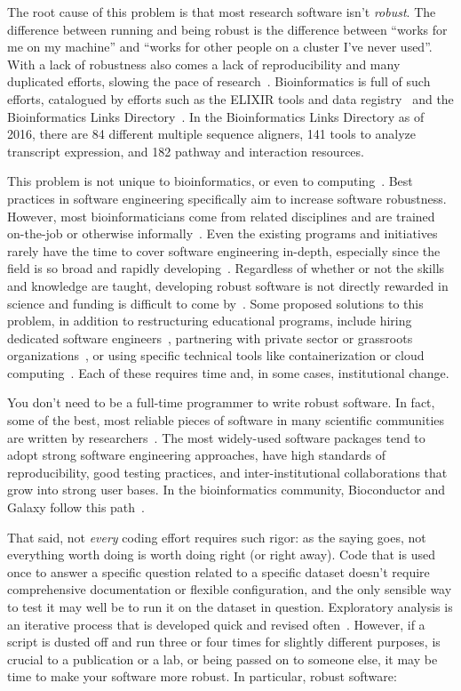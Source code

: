 \documentclass[10pt,letterpaper]{article}
\begin{document}
The root cause of this problem is that most research software
isn't \emph{robust}. The difference between running and being
robust is the difference between ``works for me on my machine'' and
``works for other people on a cluster I've never used''. With a lack of
robustness also comes a lack of reproducibility and many duplicated efforts,
slowing the pace of research~\cite{prabhu2011,lawlor2015}.
Bioinformatics is full of such efforts, catalogued by efforts such as
the ELIXIR tools and data registry~\cite{ison2016}
and the Bioinformatics Links Directory~\cite{brazas2012}. In the Bioinformatics
Links Directory as of 2016, there are 84 different multiple sequence aligners, 141 tools
to analyze transcript expression, and 182 pathway and interaction resources.

This problem is not unique to bioinformatics, or even to computing~\cite{baker2016}. 
Best practices in software engineering specifically aim to increase software
robustness. However, most bioinformaticians come from related disciplines and
are trained on-the-job or otherwise informally~\cite{prins2015,atwood2015}. Even
the existing programs and initiatives rarely have the time to cover software engineering
in-depth, especially since the field is so broad and rapidly
developing~\cite{atwood2015,lawlor2015}. Regardless of whether or not the skills
and knowledge are taught, developing robust software is not directly rewarded
in science and funding is difficult to come by~\cite{prins2015}. Some proposed
solutions to this problem, in addition to restructuring educational programs,
include hiring dedicated software engineers~\cite{lawlor2015,sanders2008},
partnering with private sector or grassroots organizations~\cite{prins2015,ison2016},
or using specific technical tools like containerization or cloud
computing~\cite{afgan2016,howe2012}. Each of these requires time and, in some
cases, institutional change.

You don't need to be a full-time programmer to write robust software. In fact,
some of the best, most reliable pieces of software in many scientific
communities are written by researchers~\cite{prabhu2011,sanders2008}. 
The most widely-used software packages tend to adopt strong software
engineering approaches, have high standards of reproducibility, good testing
practices, and inter-institutional collaborations that grow into strong user
bases. In the bioinformatics community, Bioconductor and Galaxy follow this
path~\cite{gentleman2004,afgan2016}.

That said, not \emph{every} coding effort requires such rigor:
as the saying goes, not everything worth doing is worth doing right (or right away).
Code that is used once to answer a specific question related to a specific dataset
doesn't require comprehensive documentation or flexible configuration,
and the only sensible way to test it may well be to run it on the dataset in
question. Exploratory analysis is an iterative process that is developed
quick and revised often~\cite{lawlor2015,sanders2008}. 
However, if a script is dusted off and run three or four
times for slightly different purposes,
is crucial to a publication or a lab,
or being passed on to someone else,
it may be time to make your software more robust.
In particular, robust software:
\end{document}
